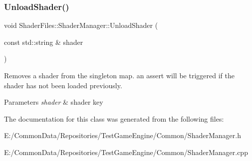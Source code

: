 \subsubsection{\texorpdfstring{UnloadShader()}{UnloadShader()}}
{\footnotesize\ttfamily void Shader\+Files\+::\+Shader\+Manager\+::\+Unload\+Shader (\begin{DoxyParamCaption}\item[{const std\+::string \&}]{shader }\end{DoxyParamCaption})}

Removes a shader from the singleton map. an assert will be triggered if the shader has not been loaded previously. 
\begin{DoxyParams}{Parameters}
{\em shader} & shader key \\
\hline
\end{DoxyParams}


The documentation for this class was generated from the following files\+:\begin{DoxyCompactItemize}
\item 
E\+:/\+Common\+Data/\+Repositories/\+Test\+Game\+Engine/\+Common/Shader\+Manager.\+h\item 
E\+:/\+Common\+Data/\+Repositories/\+Test\+Game\+Engine/\+Common/Shader\+Manager.\+cpp\end{DoxyCompactItemize}

